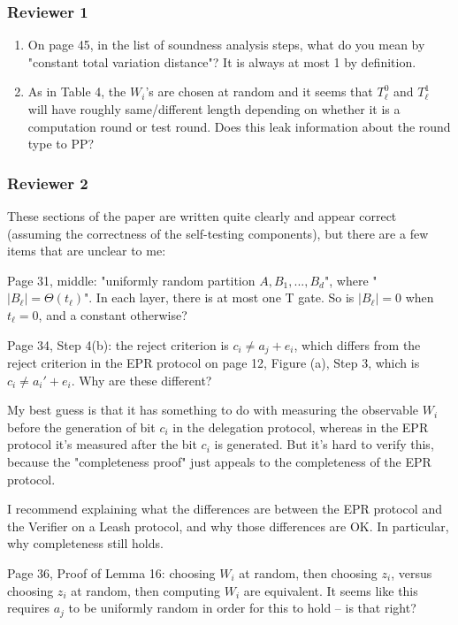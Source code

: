 \documentclass[12pt]{article}
\begin{document}
\subsubsection*{Reviewer 1}
\begin{enumerate}
\item On page 45, in the list of soundness analysis steps, what do you mean by "constant total variation distance"? It is always at most 1 by definition.
\item As in Table 4, the $W_i$'s are chosen at random and it seems that $T^0_\ell$ and $T^1_\ell$ will have roughly same/different length depending on whether it is a computation round or test round. Does this leak information about the round type to PP?

\end{enumerate}

\subsubsection*{Reviewer 2}

These sections of the paper are written quite clearly and appear correct (assuming the correctness of the self-testing components), but there are a few items that are unclear to me:

Page 31, middle: "uniformly random partition $A, B_1,..., B_d$", where "$|B_\ell| = \Theta(t_\ell)$". In each layer, there is at most one T gate. So is $|B_\ell| = 0$ when $t_\ell = 0$, and a constant otherwise?

Page 34, Step 4(b): the reject criterion is $c_i \neq a_j + e_i$, which differs from the reject criterion in the EPR protocol on page 12, Figure (a), Step 3, which is $c_i \neq a_i' + e_i$. Why are these different?

My best guess is that it has something to do with measuring the observable $W_i$ before the generation of bit $c_i$ in the delegation protocol, whereas in the EPR protocol it's measured after the bit $c_i$ is generated. But it's hard to verify this, because the "completeness proof" just appeals to the completeness of the EPR protocol.

I recommend explaining what the differences are between the EPR protocol and the Verifier on a Leash protocol, and why those differences are OK. In particular, why completeness still holds.

Page 36, Proof of Lemma 16: choosing $W_i$ at random, then choosing $z_i$, versus choosing $z_i$ at random, then computing $W_i$ are equivalent. It seems like this requires $a_j$ to be uniformly random in order for this to hold -- is that right?
\end{document}

